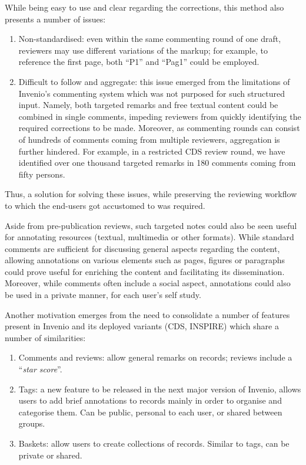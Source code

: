 While being easy to use and clear regarding the corrections, this method also
presents a number of issues:
  \begin{enumerate}
    \item Non-standardised: even within the same commenting round of one draft,
      reviewers may use different variations of the markup; for example, to
      reference the first page, both ``P1'' and ``Pag1'' could be employed.
    \item Difficult to follow and aggregate: this issue emerged from the
      limitations of Invenio's commenting system which was not purposed for such
      structured input. Namely, both targeted remarks and free textual content
      could be combined in single comments, impeding reviewers from quickly
      identifying the required corrections to be made. Moreover, as commenting
      rounds can consist of hundreds of comments coming from multiple reviewers,
      aggregation is further hindered. For example, in a restricted CDS review
      round, we have identified over one thousand targeted remarks in 180
      comments coming from fifty persons.
  \end{enumerate}
Thus, a solution for solving these issues, while preserving the reviewing
workflow to which the end-users got accustomed to was required.

Aside from pre-publication reviews, such targeted notes could also be seen
useful for annotating resources (textual, multimedia or other formats). While
standard comments are sufficient for discussing general aspects regarding the
content, allowing annotations on various elements such as pages, figures or
paragraphs could prove useful for enriching the content and facilitating its
dissemination. Moreover, while comments often include a social aspect,
annotations could also be used in a private manner, for each user's self study.


Another motivation emerges from the need to consolidate a number of features
present in Invenio and its deployed variants (CDS, INSPIRE) which share a number
of similarities:
\begin{enumerate}
  \item Comments and reviews: allow general remarks on records; reviews include
    a ``\textit{star score}''.
  \item Tags: a new feature to be released in the next major version of Invenio,
    allows users to add brief annotations to records mainly in order to
    organise and categorise them. Can be public, personal to each user, or
    shared between groups.
  \item Baskets: allow users to create collections of records. Similar to tags,
    can be private or shared.
\end{enumerate}


